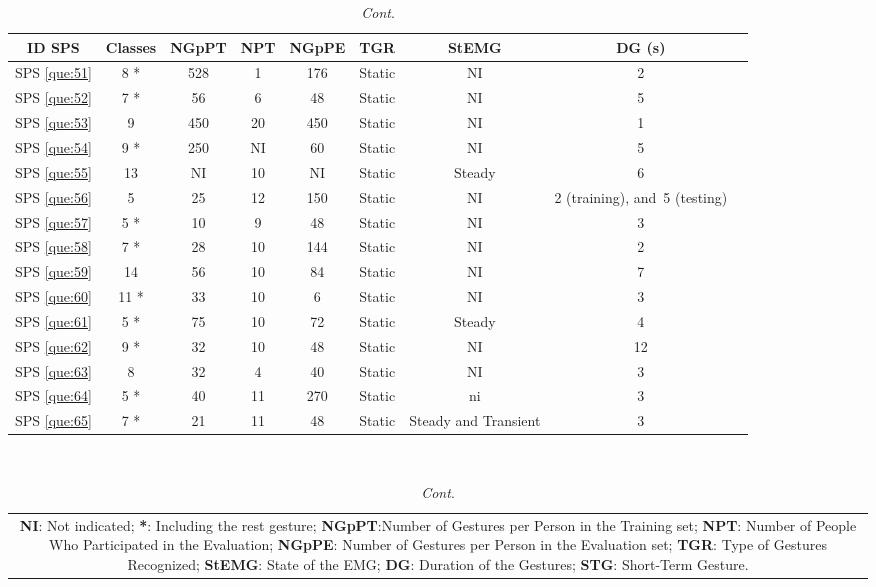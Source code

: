 \documentclass[sensors,review,accept,moreauthors,pdftex]{Definitions/mdpi}
\begin{document}
\begin{table}[H]\ContinuedFloat
\centering
\caption{\textit{Cont}.}
\begin{tabular}{ccccccccc}
	\toprule
	
	\textbf{ID SPS}&\textbf{Classes}&\textbf{NGpPT}&\textbf{NPT} &\textbf{NGpPE}&\textbf{TGR}&\textbf{StEMG}&\textbf{DG (s)}\\
	\midrule

	
	SPS \ref{que:51}	&	8 *	&	528	&	1	&	176	&	Static	&	NI	&	2	\\	
	SPS \ref{que:52}	&	7 *	&	56	&	6	&	48	&	Static	&	NI	&	5	\\	
	SPS \ref{que:53}	&	9	&	450	&	20	&	450	&	Static	&	NI	&	1	\\	
	SPS \ref{que:54}	&	9 *	&	250	&	NI	&	60	&	Static	&	NI	&	5	\\	
	SPS \ref{que:55}	&	13	&	NI	&	10	&	NI	&	Static	&	Steady	&	6	\\	
	SPS \ref{que:56}	&	5	&	25	&	12	&	150	&	Static	&	NI	&	2 (training), and~5 (testing)	\\	
	
	
	SPS \ref{que:57}	&	5 *	&	10	&	9	&	48	&	Static	&	NI	&	3	\\	
	SPS \ref{que:58}	&	7 *	&	28	&	10	&	144	&	Static	&	NI	&	2	\\	
	SPS \ref{que:59}	&	14	&	56	&	10	&	84	&	Static	&	NI	&	7	\\	
	SPS \ref{que:60}	&	11 *	&	33	&	10	&	6	&	Static	&	NI	&	3	\\	
	SPS \ref{que:61}	&	5 *	&	75	&	10	&	72	&	Static	&	Steady	&	4	\\	
	SPS \ref{que:62}	&	9 *	&	32	&	10	&	48	&	Static	&	NI	&	12	\\	
	SPS \ref{que:63}	&	8	&	32	&	4	&	40	&	Static	&	NI	&	3	\\	
	SPS \ref{que:64}	&	5 *	&	40	&	11	&	270	&	Static	&	ni	&	3	\\	
	SPS \ref{que:65}	&	7 *	&	21	&	11	&	48	&	Static	&	Steady and Transient	&	3	\\	
			\bottomrule
	\end{tabular}\\
\begin{tabular}{@{}c@{}} 
\multicolumn{1}{p{\textwidth -.88in}}{\footnotesize \textbf{NI}: Not indicated; \textbf{*}: Including the rest gesture; \textbf{NGpPT}:Number of Gestures per Person in the Training set; \textbf{NPT}: Number of People Who Participated in the Evaluation; \textbf{NGpPE}: Number of Gestures per Person in the Evaluation set; \textbf{TGR}: Type of Gestures Recognized; \textbf{StEMG}: State of the EMG; \textbf{DG}: Duration of the Gestures; \textbf{STG}: Short-Term Gesture.}
\end{tabular}	
		
	
		
	
	
		
		

	
\end{table}
\end{document}
